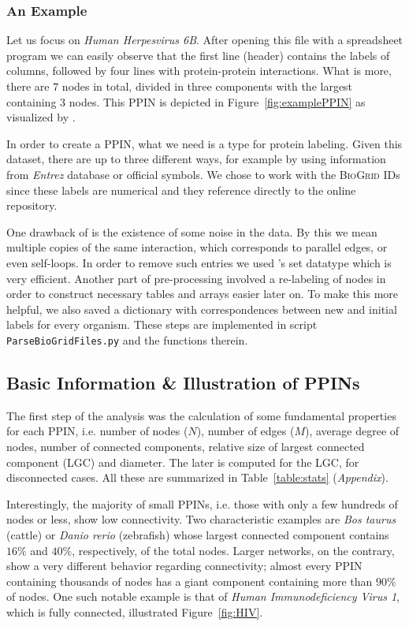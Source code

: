 \subsubsection*{An Example} Let us focus on \textit{Human Herpesvirus 6B}. After opening this file with a spreadsheet program we can easily observe that the first line (header) contains the labels of columns, followed by four lines with protein-protein interactions. What is more, there are $7$ nodes in total, divided in three components with the largest containing $3$ nodes. This PPIN is depicted in Figure~\ref{fig:examplePPIN} as visualized by \NX. 

In order to create a PPIN, what we need is a type for protein labeling. Given this dataset, there are up to three different ways, for example by using information from \textit{Entrez} database or official symbols. We chose to work with the \textsc{BioGrid} IDs since these labels are numerical and they reference directly to the online repository. 

One drawback of \BGRD is the existence of some noise in the data. By this we mean multiple copies of the same interaction, which corresponds to parallel edges, or even self-loops. In order to remove such entries we used \PY's set datatype which is very efficient. Another part of pre-processing involved a re-labeling of nodes in order to construct necessary tables and arrays easier later on. To make this more helpful, we also saved a dictionary with correspondences between new and initial labels for every organism.  These steps are implemented in script \texttt{ParseBioGridFiles.py} and the functions therein.

\subsection{Basic Information \& Illustration of PPINs}
%
The first step of the analysis was the calculation of some fundamental properties for each PPIN, i.e. number of nodes ($N$), number of edges ($M$), average degree of nodes, number of connected components, relative size of largest connected component (LGC) and diameter. The later is computed for the LGC, for disconnected cases.  All these are summarized in Table~\ref{table:stats} (\textit{Appendix}). 

Interestingly, the majority of small PPINs, i.e. those with only a few hundreds of nodes or less, show low connectivity. Two characteristic examples are \textit{Bos taurus} (cattle) or \textit{Danio rerio} (zebrafish) whose largest connected component contains $16\%$ and $40\%$, respectively, of the total nodes. Larger networks, on the contrary, show a very different behavior regarding connectivity; almost every PPIN containing thousands of nodes has a giant component containing more than $90\%$ of nodes. One such notable example is that of \textit{Human Immunodeficiency Virus 1}, which is fully connected, illustrated Figure~\ref{fig:HIV}. 

